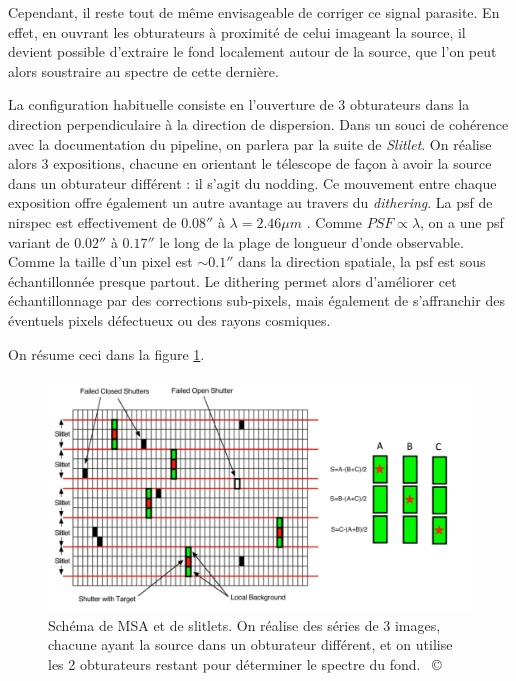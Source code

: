 \documentclass[11pt, a4paper]{article}
\newcommand{\customcite}[1]{\mbox{
  {\small \copyright} \cite{#1}}
}
\begin{document}
Cependant, il reste tout de même envisageable de corriger ce signal parasite. En effet, en ouvrant les obturateurs à proximité de celui imageant la source, il devient possible d'extraire le fond localement autour de la source, que l'on peut alors soustraire au spectre de cette dernière.

La configuration habituelle consiste en l'ouverture de 3 obturateurs dans la direction perpendiculaire à la direction de dispersion. Dans un souci de cohérence avec la documentation du pipeline, on parlera par la suite de \textit{Slitlet}. On réalise alors 3 expositions, chacune en orientant le télescope de façon à avoir la source dans un obturateur différent : il s'agit du nodding. Ce mouvement entre chaque exposition offre également un autre avantage au travers du \textit{dithering}. La \gls{psf} de \gls{nirspec} est effectivement de $0.08 ''$ à $\lambda = 2.46 \mu m$ \parencite{10_1051_0004_6361_202142663}. 
Comme $PSF \propto \lambda$, on a une \gls{psf} variant de $0.02 ''$ à $0.17''$ le long de la plage de longueur d'onde observable. Comme la taille d'un pixel est $\sim 0.1''$ dans la direction spatiale, la \gls{psf} est sous échantillonnée presque partout. Le dithering permet alors d'améliorer cet échantillonnage par des corrections sub-pixels, mais également de s'affranchir des éventuels pixels défectueux ou des rayons cosmiques.

On résume ceci dans la figure \ref{fig:msa_slitlet}.


\begin{figure}[H]
  \centering
  \includegraphics[scale=0.2]{assets/MSA_sky_strategy.png}
  \caption{Schéma de MSA et de slitlets. On réalise des séries de 3 images, chacune ayant la source dans un obturateur différent, et on utilise les 2 obturateurs restant pour déterminer le spectre du fond. \customcite{mos}}
  \label{fig:msa_slitlet}
\end{figure}
\end{document}
